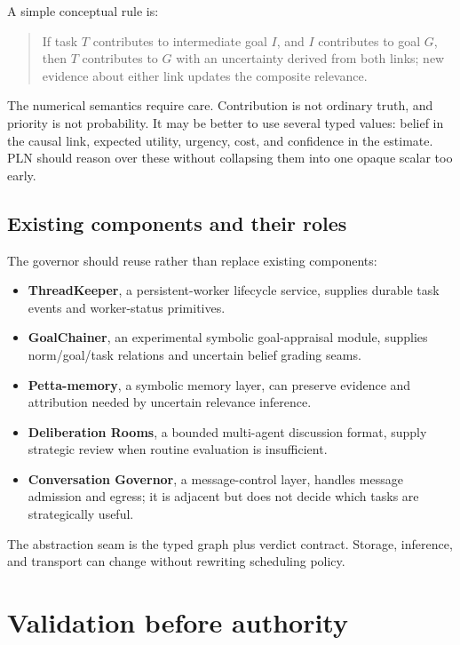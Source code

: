 \documentclass[11pt,letterpaper]{article}
\newcommand{\term}[1]{\textbf{#1}}
\begin{document}
A simple conceptual rule is:

\begin{quote}
If task $T$ contributes to intermediate goal $I$, and $I$ contributes to goal
$G$, then $T$ contributes to $G$ with an uncertainty derived from both links;
new evidence about either link updates the composite relevance.
\end{quote}

The numerical semantics require care. Contribution is not ordinary truth, and
priority is not probability. It may be better to use several typed values:
belief in the causal link, expected utility, urgency, cost, and confidence in
the estimate. PLN should reason over these without collapsing them into one
opaque scalar too early.

\subsection{Existing components and their roles}

The governor should reuse rather than replace existing components:

\begin{itemize}
  \item \term{ThreadKeeper}, a persistent-worker lifecycle service, supplies
        durable task events and worker-status primitives.
  \item \term{GoalChainer}, an experimental symbolic goal-appraisal module,
        supplies norm/goal/task relations and uncertain belief grading seams.
  \item \term{Petta-memory}, a symbolic memory layer, can preserve evidence and
        attribution needed by uncertain relevance inference.
  \item \term{Deliberation Rooms}, a bounded multi-agent discussion format,
        supply strategic review when routine evaluation is insufficient.
  \item \term{Conversation Governor}, a message-control layer, handles message admission and egress;
        it is adjacent but does not decide which tasks are strategically useful.
\end{itemize}

The abstraction seam is the typed graph plus verdict contract. Storage,
inference, and transport can change without rewriting scheduling policy.

\section{Validation before authority}
\end{document}
